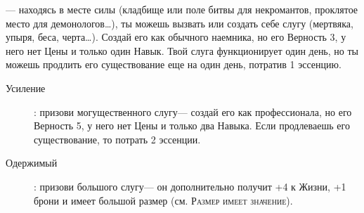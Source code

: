 \documentclass[10pt,twoside]{report}
\begin{document}
\begin{description}[noitemsep]
\item[Призыв слуги]--- находясь в месте силы (кладбище или поле битвы
  для некромантов, проклятое место для демонологов\ldots), ты можешь
  вызвать или создать себе слугу (мертвяка, упыря, беса, черта\ldots). Создай его как обычного наемника, но его Верность 3, у него
  нет Цены и только один Навык. Твой слуга функционирует один день, но
  ты можешь продлить его существование еще на один день, потратив 1
  эссенцию.
  \begin{description}
    \item[Усиление]: призови могущественного слугу--- создай его как
      профессионала, но его Верность 5, у него нет Цены и только два
      Навыка. Если продлеваешь его существование, то потрать 2
      эссенции.
      \item[Одержимый]: призови большого слугу--- он дополнительно
        получит +4 к Жизни, +1 брони и имеет большой размер
        (см. {\scshape Размер имеет значение}).
\end{description}
\end{description}
\vfill
\end{document}
